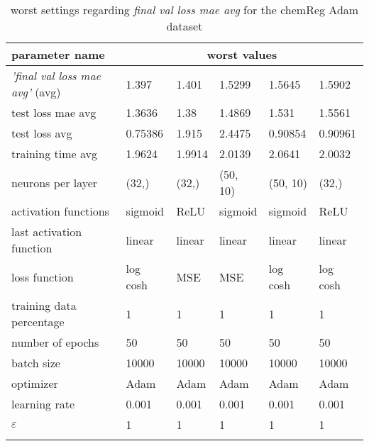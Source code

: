 \begin{longtable}{|l|l|l|l|l|>{\columncolor{worstColumnColor}}l|}
\hline
\textbf{parameter name} & \multicolumn{5}{c|}{\textbf{worst values}} \\
\hline
\textit{'final val loss mae avg'} (avg) &   1.397 &   1.401 &  1.5299 &  1.5645 &  1.5902 \\
test loss mae avg        & 1.3636  & 1.38    & 1.4869  & 1.531   & 1.5561  \\
test loss avg            & 0.75386 & 1.915   & 2.4475  & 0.90854 & 0.90961 \\
training time avg        & 1.9624  & 1.9914  & 2.0139  & 2.0641  & 2.0032  \\
neurons per layer        & (32,)   & (32,)   & (50, 10) & (50, 10) & (32,)   \\
activation functions     & sigmoid & ReLU    & sigmoid & sigmoid & ReLU    \\
{\color{equalParamColor} last activation function } & {\color{equalParamColor} linear } & {\color{equalParamColor} linear } & {\color{equalParamColor} linear } & {\color{equalParamColor} linear } & {\color{equalParamColor} linear } \\
loss function            & log cosh & MSE     & MSE     & log cosh & log cosh \\
{\color{equalParamColor} training data percentage } & {\color{equalParamColor} 1 } & {\color{equalParamColor} 1 } & {\color{equalParamColor} 1 } & {\color{equalParamColor} 1 } & {\color{equalParamColor} 1 } \\
{\color{equalParamColor} number of epochs } & {\color{equalParamColor} 50 } & {\color{equalParamColor} 50 } & {\color{equalParamColor} 50 } & {\color{equalParamColor} 50 } & {\color{equalParamColor} 50 } \\
{\color{equalParamColor} batch size } & {\color{equalParamColor} 10000 } & {\color{equalParamColor} 10000 } & {\color{equalParamColor} 10000 } & {\color{equalParamColor} 10000 } & {\color{equalParamColor} 10000 } \\
{\color{equalParamColor} optimizer } & {\color{equalParamColor} Adam } & {\color{equalParamColor} Adam } & {\color{equalParamColor} Adam } & {\color{equalParamColor} Adam } & {\color{equalParamColor} Adam } \\
{\color{equalParamColor} learning rate } & {\color{equalParamColor} 0.001 } & {\color{equalParamColor} 0.001 } & {\color{equalParamColor} 0.001 } & {\color{equalParamColor} 0.001 } & {\color{equalParamColor} 0.001 } \\
{\color{equalParamColor} $\varepsilon$ } & {\color{equalParamColor} 1 } & {\color{equalParamColor} 1 } & {\color{equalParamColor} 1 } & {\color{equalParamColor} 1 } & {\color{equalParamColor} 1 } \\
\hline

\caption{worst settings regarding \textit{final val loss mae avg} for the chemReg Adam dataset}
\label{table:final_val_loss_mae_avg_worst_chemreg_adam}
\end{longtable}
